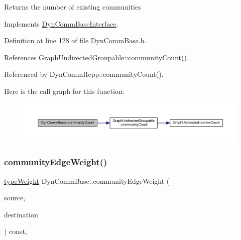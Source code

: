 \begin{DoxyReturn}{Returns}
the number of existing communities 
\end{DoxyReturn}


Implements \hyperlink{classDynCommBaseInterface_aa61588ce385fd66855e17747cf188a85}{Dyn\+Comm\+Base\+Interface}.



Definition at line 128 of file Dyn\+Comm\+Base.\+h.



References Graph\+Undirected\+Groupable\+::community\+Count().



Referenced by Dyn\+Comm\+Rcpp\+::community\+Count().

Here is the call graph for this function\+:\nopagebreak
\begin{figure}[H]
\begin{center}
\leavevmode
\includegraphics[width=350pt]{classDynCommBase_add5d1d59a3f20b4ba039342b31551fb3_cgraph}
\end{center}
\end{figure}
\mbox{\label{classDynCommBase_a1ef408ec71d82b008fc0229416c77b61}} 
\subsubsection{\texorpdfstring{community\+Edge\+Weight()}{communityEdgeWeight()}}
{\footnotesize\ttfamily \hyperlink{edge_8h_a2e7ea3be891ac8b52f749ec73fee6dd2}{type\+Weight} Dyn\+Comm\+Base\+::community\+Edge\+Weight (\begin{DoxyParamCaption}\item[{\hyperlink{graphUndirectedGroupable_8h_a914da95c9ea7f14f4b7f875c36818556}{type\+Community}}]{source,  }\item[{\hyperlink{graphUndirectedGroupable_8h_a914da95c9ea7f14f4b7f875c36818556}{type\+Community}}]{destination }\end{DoxyParamCaption}) const\hspace{0.3cm}{\ttfamily [inline]}, {\ttfamily [virtual]}}

